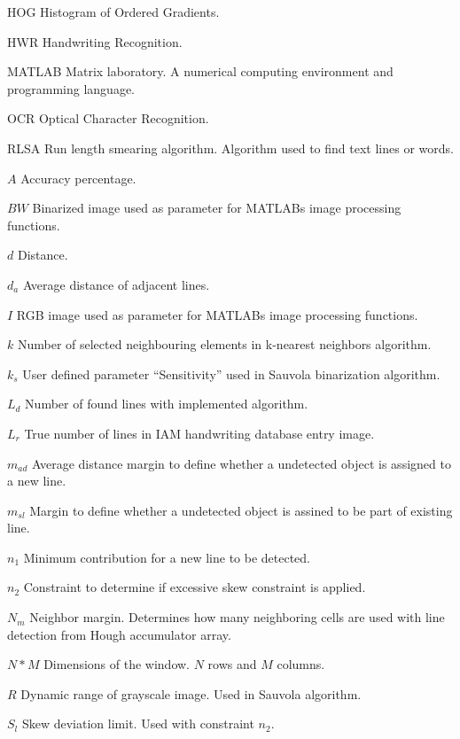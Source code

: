 \documentclass{article}
\begin{document}
   \begin{abbrv}
    \item[HOG] Histogram of Ordered Gradients.
    \item[HWR] Handwriting Recognition.
    \item[MATLAB] Matrix laboratory. A numerical computing environment and programming language.
    \item[OCR] Optical Character Recognition.
    \item[RLSA] Run length smearing algorithm. Algorithm used to find text lines or words.

    \item[$A$] Accuracy percentage.
    \item[$BW$] Binarized image used as parameter for MATLABs image processing functions.
    \item[$d$] Distance.
    \item[$d_a$] Average distance of adjacent lines.
    \item[$I$] RGB image used as parameter for MATLABs image processing functions.
    \item[$k$] Number of selected neighbouring elements in k-nearest neighbors algorithm.
    \item[$k_s$] User defined parameter ``Sensitivity'' used in Sauvola binarization algorithm.
    \item[$L_d$] Number of found lines with implemented algorithm.
    \item[$L_r$] True number of lines in IAM handwriting database entry image.
    \item[$m_{ad}$] Average distance margin to define whether a undetected object is assigned to a new line.
    \item[$m_{sl}$] Margin to define whether a undetected object is assined to be part of existing line.
    \item[$n_1$] Minimum contribution for a new line to be detected.
    \item[$n_2$] Constraint to determine if excessive skew constraint is applied.
    \item[$N_m$] Neighbor margin. Determines how many neighboring cells are used with line detection from Hough accumulator array.
    \item[$N * M$] Dimensions of the window. $N$ rows and $M$ columns.
    \item[$R$] Dynamic range of grayscale image. Used in Sauvola algorithm.
    \item[$S_l$] Skew deviation limit. Used with constraint $n_2$.

\end{abbrv}
\end{document}

